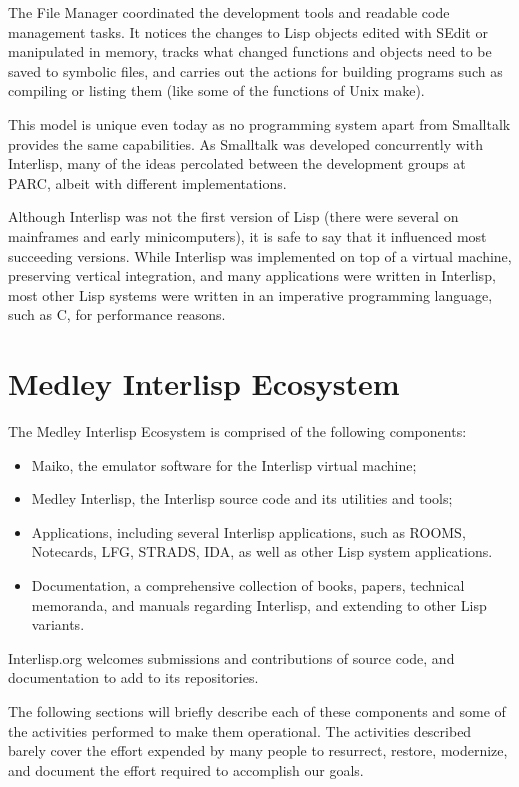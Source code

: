 \documentclass[sigconf]{acmart}
\begin{document}
The File Manager coordinated the development tools and readable code management tasks. It notices the changes to Lisp objects edited with SEdit or manipulated in memory, tracks what changed functions and objects need to be saved to symbolic files, and carries out the actions for building programs such as compiling or listing them (like some of the functions of Unix make).

This model is unique even today as no programming system apart from Smalltalk provides the same capabilities. As Smalltalk was developed concurrently with Interlisp, many of the ideas percolated between the development groups at PARC, albeit with different implementations.

Although Interlisp was not the first version of Lisp (there were several on mainframes and early minicomputers), it is safe to say that it influenced most succeeding versions. While Interlisp was implemented on top of a virtual machine, preserving vertical integration, and many applications were written in Interlisp, most other Lisp systems were written in an imperative programming language, such as C, for performance reasons.

\section{Medley Interlisp Ecosystem}

The Medley Interlisp Ecosystem is comprised of the following components:

\begin{itemize}
  \item Maiko, the emulator software for the Interlisp virtual machine;
  \item Medley Interlisp, the Interlisp source code and its utilities and tools;
  \item Applications, including several Interlisp applications, such as ROOMS, Notecards, LFG, STRADS, IDA, as well as other Lisp system applications.
  \item Documentation, a comprehensive collection of books, papers, technical memoranda, and manuals regarding Interlisp, and extending to other Lisp variants.
\end{itemize}

Interlisp.org welcomes submissions and contributions of source code, and documentation to add to its repositories.

The following sections will briefly describe each of these components and some of the activities performed to make them operational. The activities described barely cover the effort expended by many people to resurrect, restore, modernize, and document the effort required to accomplish our goals.
\end{document}

